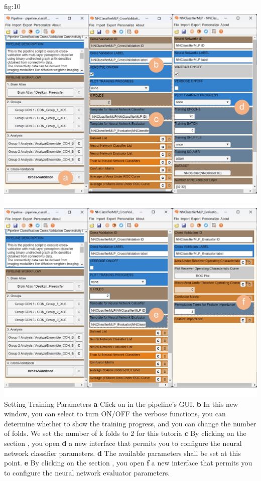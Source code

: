 \documentclass[justified]{tufte-handout}
\begin{document}
{
	{fig:10}
	{
	\includegraphics{fig10a.jpg}
	\includegraphics{fig10b.jpg}
	}
	{Setting Training Parameters}
	{
	{\bf a} Click on  in the pipeline's GUI.
	{\bf b} In this new window, you can select to turn ON/OFF the verbose functions, you can determine whether to show the training progress, and you can change the number of folds.
 	We set the number of k folds to 2 for this tutoria
	{\bf c} By clicking on the section , you open {\bf d} a new interface that permits you to configure the neural network classifier parameters.
	{\bf d} The available parameters shall be set at this point.
	{\bf e} By clicking on the section , you open {\bf f} a new interface that permits you to configure the neural network evaluator parameters.
	}

}
\end{document}
